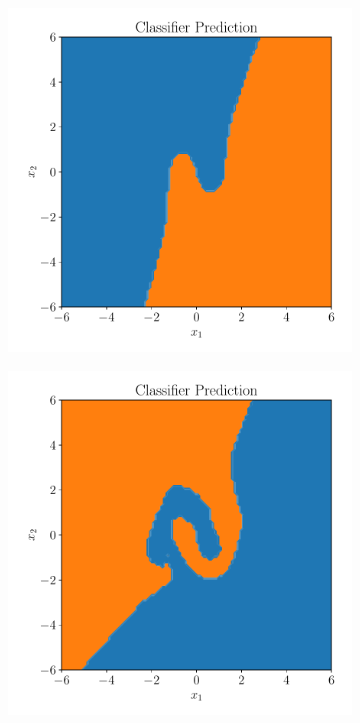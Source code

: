 \begin{figure}[htpb]
    \centering
    \begin{subfigure}[]{0.4\textwidth}
        \centering
        \includegraphics[width=\linewidth]{figures/toy_example/moons/classifier_class.pdf}
        \caption{}
        \label{fig:}
    \end{subfigure}
    \begin{subfigure}[]{0.4\textwidth}
        \centering
        \includegraphics[width=\linewidth]{figures/toy_example/moons/classifier_kl_class.pdf}

\end{subfigure}
\end{figure}
